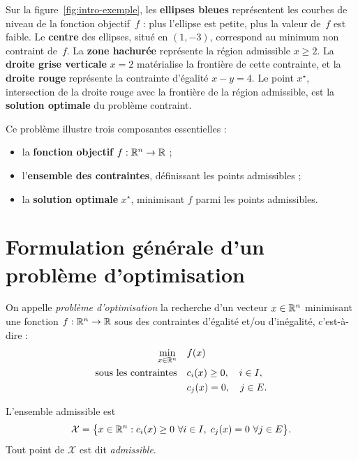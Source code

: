 \begin{figureexplanation}
Sur la figure~\ref{fig:intro-exemple}, les \textbf{ellipses bleues} représentent les courbes de niveau de la fonction objectif~$f$ : plus l'ellipse est petite, plus la valeur de~$f$ est faible. Le \textbf{centre} des ellipses, situé en $(1,-3)$, correspond au minimum non contraint de~$f$. La \textbf{zone hachurée} représente la région admissible $x \ge 2$. La \textbf{droite grise verticale} $x = 2$ matérialise la frontière de cette contrainte, et la \textbf{droite rouge} représente la contrainte d'égalité $x - y = 4$. Le point $x^\star$, intersection de la droite rouge avec la frontière de la région admissible, est la \textbf{solution optimale} du problème contraint.
\end{figureexplanation}

Ce problème illustre trois composantes essentielles :
\begin{itemize}
  \item la \textbf{fonction objectif} $f : \mathbb{R}^n \to \mathbb{R}$ ;
  \item l'\textbf{ensemble des contraintes}, définissant les points admissibles ;
  \item la \textbf{solution optimale} $x^\star$, minimisant $f$ parmi les points admissibles.
\end{itemize}

\section{Formulation générale d'un problème d'optimisation}

\begin{definition}
On appelle \emph{problème d’optimisation} la recherche d'un vecteur
$x \in \mathbb{R}^n$ minimisant une fonction $f : \mathbb{R}^n \to \mathbb{R}$ sous des contraintes
d’égalité et/ou d’inégalité, c’est-à-dire :
\begin{equation}
  \begin{aligned}
    \min_{x \in \mathbb{R}^n} \quad & f(x) \\
    \text{sous les contraintes} \quad &
    c_i(x) \ge 0,\quad i \in I, \\
    & c_j(x) = 0,\quad j \in E.
  \end{aligned}
  \label{eq:general-problem}
\end{equation}
\end{definition}

\begin{definition}
L'ensemble admissible est
\[
\mathcal{X} = \bigl\{x \in \mathbb{R}^n : c_i(x)\ge 0\ \forall i\in I,\; c_j(x)=0\ \forall j\in E\bigr\}.
\]
Tout point de $\mathcal{X}$ est dit \emph{admissible}.
\end{definition}

